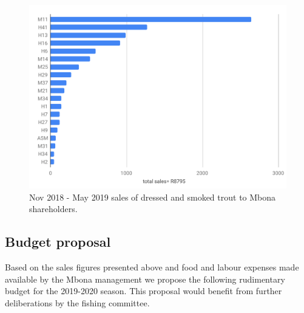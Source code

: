 \begin{figure}[H]
  \centering
  \includegraphics[scale = 0.75]{tables/MbonaTroutShareholderSales.pdf}
   \caption{Nov 2018 - May 2019 sales of dressed and smoked trout to Mbona shareholders.}
  \label{fig:ShareholderSales}
\end{figure}

\subsection{Budget proposal}

Based on the sales figures presented above and food and labour expenses made available
by the Mbona management we propose the following rudimentary budget for the 2019-2020
season. This proposal would benefit from further deliberations by the fishing committee.

